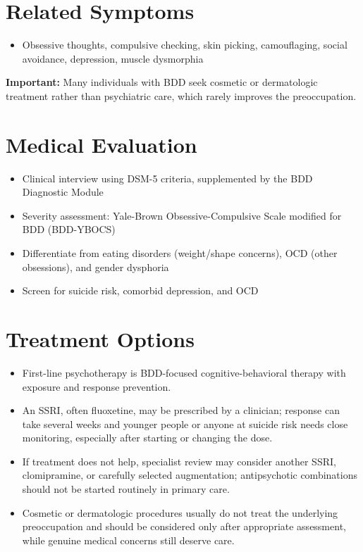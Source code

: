 \section*{Related Symptoms}
\begin{itemize}
 \item Obsessive thoughts, compulsive checking, skin picking, camouflaging, social avoidance, depression, muscle dysmorphia
\end{itemize}
\textbf{Important:} Many individuals with BDD seek cosmetic or dermatologic treatment rather than psychiatric care, which rarely improves the preoccupation.

\section*{Medical Evaluation}
\begin{itemize}
 \item Clinical interview using DSM-5 criteria, supplemented by the BDD Diagnostic Module
 \item Severity assessment: Yale-Brown Obsessive-Compulsive Scale modified for BDD (BDD-YBOCS)
 \item Differentiate from eating disorders (weight/shape concerns), OCD (other obsessions), and gender dysphoria
 \item Screen for suicide risk, comorbid depression, and OCD
\end{itemize}

\section*{Treatment Options}
\begin{itemize}
 \item First-line psychotherapy is BDD-focused cognitive-behavioral therapy with exposure and response prevention.
 \item An SSRI, often fluoxetine, may be prescribed by a clinician; response can take several weeks and younger people or anyone at suicide risk needs close monitoring, especially after starting or changing the dose.
 \item If treatment does not help, specialist review may consider another SSRI, clomipramine, or carefully selected augmentation; antipsychotic combinations should not be started routinely in primary care.
 \item Cosmetic or dermatologic procedures usually do not treat the underlying preoccupation and should be considered only after appropriate assessment, while genuine medical concerns still deserve care.
\end{itemize}

